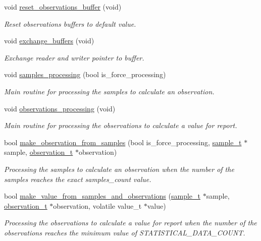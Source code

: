 \begin{DoxyCompactItemize}
void \hyperlink{i2c-th_8h_a49fdbb850fac1a3832e7852a24c31c72}{reset\+\_\+observations\+\_\+buffer} (void)
\begin{DoxyCompactList}\small\item\em Reset observations buffers to default value. \end{DoxyCompactList}\item 
void \hyperlink{i2c-th_8h_aafa3d59a1bde3085849eee08f110612f}{exchange\+\_\+buffers} (void)
\begin{DoxyCompactList}\small\item\em Exchange reader and writer pointer to buffer. \end{DoxyCompactList}\item 
void \hyperlink{i2c-th_8h_aba0fc91d6c2829df00a9d5fe2b921c90}{samples\+\_\+processing} (bool is\+\_\+force\+\_\+processing)
\begin{DoxyCompactList}\small\item\em Main routine for processing the samples to calculate an observation. \end{DoxyCompactList}\item 
void \hyperlink{i2c-th_8h_a8b67eda853f3e8cca0c729267b492861}{observations\+\_\+processing} (void)
\begin{DoxyCompactList}\small\item\em Main routine for processing the observations to calculate a value for report. \end{DoxyCompactList}\item 
bool \hyperlink{i2c-th_8h_a1c5769e114267b210fb3812064d01dd0}{make\+\_\+observation\+\_\+from\+\_\+samples} (bool is\+\_\+force\+\_\+processing, \hyperlink{structsample__t}{sample\+\_\+t} $\ast$sample, \hyperlink{structobservation__t}{observation\+\_\+t} $\ast$observation)
\begin{DoxyCompactList}\small\item\em Processing the samples to calculate an observation when the number of the samples reaches the exact samples\+\_\+count value. \end{DoxyCompactList}\item 
bool \hyperlink{i2c-th_8h_ab301e4d552826ef91458f52963949a1d}{make\+\_\+value\+\_\+from\+\_\+samples\+\_\+and\+\_\+observations} (\hyperlink{structsample__t}{sample\+\_\+t} $\ast$sample, \hyperlink{structobservation__t}{observation\+\_\+t} $\ast$observation, volatile value\+\_\+t $\ast$value)
\begin{DoxyCompactList}\small\item\em Processing the observations to calculate a value for report when the number of the observations reaches the minimum value of S\+T\+A\+T\+I\+S\+T\+I\+C\+A\+L\+\_\+\+D\+A\+T\+A\+\_\+\+C\+O\+U\+NT. \end{DoxyCompactList}\item 

\end{DoxyCompactItemize}
